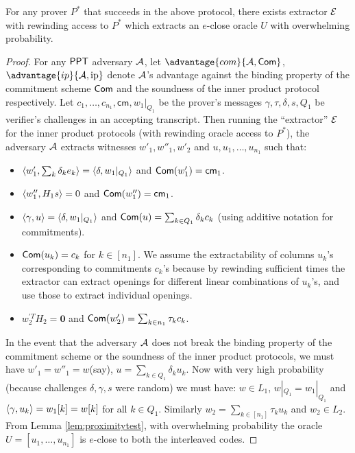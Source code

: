 \begin{lemma}\label{lem:soundbic}
For any prover $P^\ast$ that succeeds in the above protocol, there exists
extractor $\mathcal{E}$ with rewinding access to $P^\ast$ which extracts an
$e$-close oracle $U$ with overwhelming probability.
\end{lemma}
\begin{proof}
For any $\mathsf{PPT}$ adversary $\mathcal{A}$, let $\advantage{com}{\adv,\comm}$,
$\advantage{ip}{\adv,{\rm ip}}$ denote $\mathcal{A}$'s advantage against the
binding property of the commitment scheme $\mathsf{Com}$ and the soundness of the
inner product protocol respectively. Let
$c_1,\ldots,c_{n_1},\mathsf{cm},w_1|_{Q_1}$ be the prover's messages
$\gamma,\tau,\delta,s,Q_1$ be verifier's challenges in an accepting transcript.
Then running the ``extractor'' $\mathcal{E}$ for the inner product protocols (with
rewinding oracle access to $P^\ast$), the adversary $\mathcal{A}$ extracts witnesses
$w'_1,w''_1,w'_2$ and $u,u_1,\ldots,u_{n_1}$ such that:

\begin{itemize}
\item $\langle w'_1,\sum_k\delta_ke_k\rangle=\langle \delta,w_1|_{Q_1}\rangle$ and
$\mathsf{Com}(w'_1)=\mathsf{cm}_1$.
\item $\langle w''_1,H_1s\rangle=0$ and $\mathsf{Com}(w''_1)=\mathsf{cm}_1$.
\item $\langle \gamma,u\rangle=\langle \delta,w_1|_{Q_1}\rangle$ and $\mathsf{Com}(u)=\sum_{k\in
Q_1}\delta_kc_k$ (using additive notation for commitments).
\item $\mathsf{Com}(u_k)=c_k$ for $k\in [n_1]$. We assume the extractability of
columns $u_k$'s corresponding to commitments $c_k$'s because by rewinding
sufficient times the extractor can extract openings for different linear
combinations of $u_k$'s, and use those to extract individual openings.
\item $w^{'T}_2H_2 = \bm{0}$ and $\mathsf{Com}(w'_2)=\sum_{k\in n_1}\tau_kc_k$.
\end{itemize}
In the event that the adversary $\mathcal{A}$ does not break the binding property of
the commitment scheme or the soundness of the inner product protocols, we must
have $w'_1=w''_1=w$(say), $u=\sum_{k\in Q_1} \delta_ku_k$. Now with very high
probability (because challenges $\delta,\gamma,s$ were random) we must have:
$w\in L_1$, $w|_{Q_1}=w_1|_{Q_1}$ and $\langle \gamma,u_k\rangle=w_1[k]=w[k]$ for all
$k\in Q_1$. Similarly $w_2=\sum_{k\in [n_1]}\tau_ku_k$ and $w_2\in L_2$. From
Lemma \ref{lem:proximitytest}, with overwhelming probability the oracle
$U=[u_1,\ldots,u_{n_1}]$ is $e$-close to both the interleaved codes.  
\end{proof}
